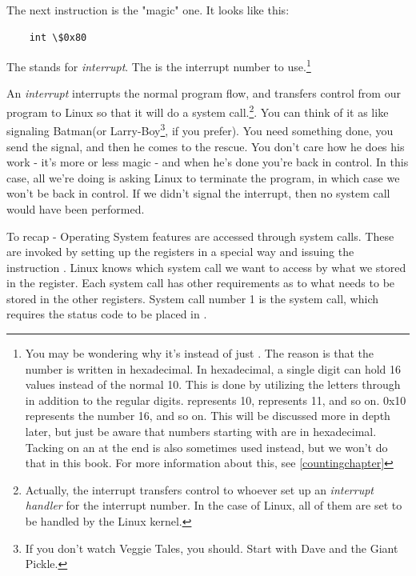The next instruction is the "magic" one.  It looks like this:

\begin{simpletyping}
\begin{lstlisting}
	int \$0x80
\end{lstlisting}
\end{simpletyping}

The  stands for 
\emph{interrupt}.  The
 is the interrupt 
number to use.\footnote{You
may be wondering why it's  instead of just 
.  The reason is that the number is written in 
hexadecimal.  In hexadecimal, a single digit can hold 16 values instead
of the normal 10.  This is done by utilizing the letters 
 through 
in addition to the regular digits.   represents 10,
 represents 11, and so on.  0x10 represents the number
16, and so on.  This will be discussed more in depth later, but just be
aware that numbers starting with  are in hexadecimal.
Tacking on an  at the end is also sometimes used instead, but
we won't do that in this book.  For more information about this, see \autoref{countingchapter}
}

An \emph{interrupt} interrupts the normal program flow, and
transfers control from our program to Linux so that it will do a system
call.\footnote{Actually, the
interrupt transfers control to whoever set up an \emph{interrupt
handler} for the interrupt number.  In the case of Linux,
all of them are set to be handled by the Linux kernel.}.
You can think of it as like signaling Batman(or 
Larry-Boy\footnote{If you don't watch Veggie Tales, you should.  Start with Dave and the Giant Pickle.}, if you prefer).
You need something done,
you send the signal, and then he comes to the rescue.  You don't care how
he does his work - it's more or less magic - and when he's done you're
back in control.  In this case, all we're doing is asking Linux to 
terminate the program, in which case we won't be back in control.  
If we didn't signal the interrupt, then no system call would have been
performed.

\begin{sidebar}
To recap - Operating System features are accessed through
system calls.  These are invoked by setting up the registers
in a special way and issuing the instruction .
Linux knows which system call we want to access by what we stored
in the {\eaxRegIdx} register.  Each system call has other requirements
as to what needs to be stored in the other registers.  System call
number 1 is the  system call, which requires
the status code
to be placed in {\ebxRegIdx}.
\end{sidebar}

